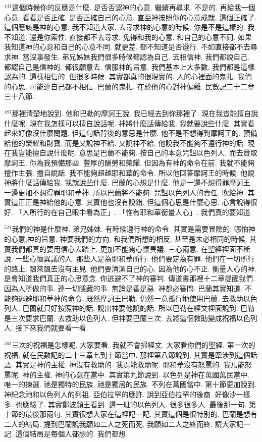 \documentclass{book}
\begin{document}
$^{441}$這個時候你的反應是什麼.
是否否認神的心意.
繼續再尋求.
不是的.
再給我一個心意.
看看是否正確.
是否正確自己的心意.
直至神按照你的心意成就.
這個正確了.
這個應該是神的心意.
我不知道大家.
去尋求神的心意的時候.
你是不是這樣的.
我不知道.
還是你索性.
直接都不去尋求.
免得和我的心意.
和自己的心意不同.
如果我知道神的心意和自己的心意不同.
就更差.
都不知道是否遵行.
不如直接都不去尋求神.
當沒事發生.
弟兄姊妹我們很多時候都認為自己.
去相信神.
我們都說自己.
都認自己是信神的.
都很願意去.
信服神的旨意.
我們基本上大多數.
我們都是這樣認為的.
這樣相信的.
但很多時候.
其實都真的很現實的.
人的心裡面的鬼扎.
我們的心思.
可能連自己都不相信.
巴蘭的鬼扎.
在於他的心對神偏離.
民數記二十二章三十八節.

$^{481}$那裡清楚地說到.
他和巴勒的摩訶王說.
我已經去到你那裡了.
現在我豈能擅自說什麼呢.
現在我怎樣可以擅自說話呢.
神將什麼話傳給我.
我就要說些什麼.
其實看起來好像沒什麼問題.
但這句話背後的意思是什麼.
他不是不想得到摩訶王的.
預備給他的榮耀和財寶.
而是又說神不給.
又說神不給.
他說我不能夠不遵行神的話.
現在我豈能擅自說什麼呢.
意思是巴蘭不能夠.
按自己的本意咒詛以色列人.
而去贊取摩訶王.
你為我預備那些.
豐厚的酬勞和榮耀.
但因為有神的命令在前.
我就不能夠擅作主張.
擅自說話.
我不能夠超越耶和華的命令.
所以他回答摩訶王的時候.
他說神將什麼話傳給我.
我就說些什麼.
巴蘭的心想是什麼.
他是一邊不想得罪摩訶王.
一邊更加不想得罪耶和華神.
所以巴蘭將不能夠.
咒詛以色列人的責任.
吹給神.
其實這正正是神給他的心意.
其實他也沒有說錯.
但這個心思是什麼心思.
心言說得很好.
「人所行的在自己眼中看為正」.
「惟有耶和華衡量人心」.
我們真的要知道.

$^{521}$我們的神是什麼神.
弟兄姊妹.
有時候遵行神的命令.
其實是需要冒險的.
哪怕神的心意,神的旨意.
神要我們的方向.
和我們所想的相反.
甚至是未必相同的時候.
其實我們都真的要用信心去踏上.
更加不能夠心懷異議.
三心兩意.
在聖經裡面不斷說.
一些心懷異議的人.
那些人是為耶和華所行.
他們要定為有罪.
他們在一切所行的路上.
飄來飄去沒有主見.
他們要清潔自己的心.
因為他的心不正.
衡量人心的神.
是會知道我們真正的心思意念.
你逃避不了神的審判.
傳道書那裡十二章提醒我們.
因為人所做的事.
連一切隱藏的事.
無論是善是惡.
神都必審問.
巴蘭其實知道.
不能夠逃避耶和華神的命令.
既然摩訶王巴勒.
仍然一意孤行地使用巴蘭.
去救助以色列人.
巴蘭就只好按照神的話.
說出神要他說的話.
所以巴勒在經文裡面說到.
巴勒是三次要求巴蘭.
去救助以色列人.
但神要巴蘭三次.
去將這個救助變成祝福以色列人.
接下來我們就要看一看.

$^{561}$三次的祝福是怎樣呢.
大家要看.
我就不會掃經文.
大家看你們的聖經.
第一次的祝福.
就在民數記的二十三章七到十節當中.
那裡第八節說到.
其實是牽涉到這個話語.
其實是神的主權.
神沒有救助的.
我焉能救助呢.
耶和華沒有怒罵的.
我焉能怒罵呢.
神的主權.
神的心意在當中.
其實第九節說到.
以色列是神在萬國萬民當中.
唯一的揀選.
祂是獨特的民族.
祂是獨居的民族.
不列在萬國當中.
第十節更加說到.
神紀念祂和以色列人的列祖.
亞伯拉罕的應許.
說到亞伯拉罕的後裔.
好像沙一樣多.
也應驗了.
其實鄭波顏王看到.
這一班的以色列人.
很多很多人.
最後那一句.
第十節的最後那兩句.
其實很想大家在這裡記一記.
其實這個是很特別的.
巴蘭是想有二人的結局.
提到巴蘭說我願如二人之死而死.
我願如二人之終而終.
請大家記一記.
這個結局是每個人都想的.
我們都想.
\end{document}
